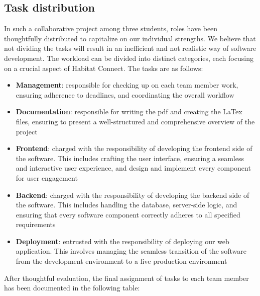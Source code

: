 \documentclass[conference]{IEEEtran}
\begin{document}
\subsection{Task distribution}
In such a collaborative project among three students, roles have been thoughtfully distributed to capitalize on our individual strengths. We believe that not dividing the tasks will result in an inefficient and not realistic way of software development. The workload can be divided into distinct categories, each focusing on a crucial aspect of Habitat Connect. The tasks are as follows:

\begin{itemize}

    \item \textbf{Management}: responsible for checking up on each team member work, ensuring adherence to deadlines, and coordinating the overall workflow
    
    \item \textbf{Documentation}: responsible for writing the pdf and creating the LaTex files, ensuring to present a well-structured and comprehensive overview of the project
    
    \item \textbf{Frontend}: charged with the responsibility of developing the frontend side of the software. This includes crafting the user interface, ensuring a seamless and interactive user experience, and design and implement every component for user engagement
    
    \item \textbf{Backend}: charged with the responsibility of developing the backend side of the software. This includes handling the database, server-side logic, and ensuring that every software component correctly adheres to all specified requirements
    
    \item \textbf{Deployment}: entrusted with the responsibility of deploying our web application. This involves managing the seamless transition of the software from the development environment to a live production environment
    
\end{itemize}

After thoughtful evaluation, the final assignment of tasks to each team member has been documented in the following table:
\end{document}

